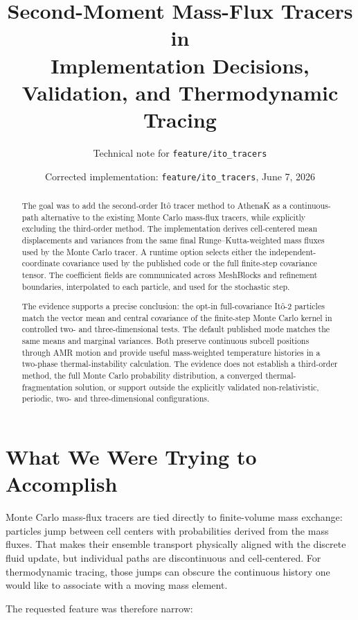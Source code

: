 \documentclass[11pt]{article}
\title{\textbf{Second-Moment \Ito{} Mass-Flux Tracers in \AthenaK{}}\\
\large Implementation Decisions, Validation, and Thermodynamic Tracing}
\author{Technical note for \texttt{feature/ito\_tracers}}
\date{Corrected implementation: \texttt{feature/ito\_tracers}, June 7, 2026}
\newcommand{\Ito}{It\^o}
\newcommand{\AthenaK}{AthenaK}
\begin{document}
\maketitle

\begin{abstract}
The goal was to add the second-order \Ito{} tracer method to \AthenaK{} as a
continuous-path alternative to the existing Monte Carlo mass-flux tracers,
while explicitly excluding the third-order method. The implementation derives
cell-centered mean displacements and variances from the same final
Runge--Kutta-weighted mass fluxes used by the Monte Carlo tracer. A runtime
option selects either the independent-coordinate covariance used by the
published code or the full finite-step covariance tensor. The coefficient
fields are communicated across MeshBlocks and refinement boundaries,
interpolated to each particle, and used for the stochastic step.

The evidence supports a precise conclusion: the opt-in full-covariance
\Ito{}-2 particles match the vector mean and central covariance of the
finite-step Monte Carlo kernel in controlled two- and three-dimensional tests.
The default published mode matches the same means and marginal variances.
Both preserve continuous subcell positions through AMR motion and provide useful
mass-weighted temperature histories in a two-phase thermal-instability
calculation. The evidence does not establish a third-order method, the full
Monte Carlo probability distribution, a converged thermal-fragmentation
solution, or support outside the explicitly validated non-relativistic,
periodic, two- and three-dimensional configurations.
\end{abstract}

\section{What We Were Trying to Accomplish}

Monte Carlo mass-flux tracers are tied directly to finite-volume mass exchange:
particles jump between cell centers with probabilities derived from the mass
fluxes. That makes their ensemble transport physically aligned with the
discrete fluid update, but individual paths are discontinuous and
cell-centered. For thermodynamic tracing, those jumps can obscure the
continuous history one would like to associate with a moving mass element.

The requested feature was therefore narrow:
\end{document}
